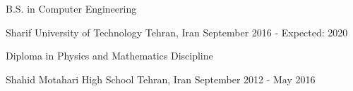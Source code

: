 \begin{cventries}
  \cventry
    {
        \begin{cvitems}
            B.S. in Computer Engineering
        \end{cvitems}
    }
    {Sharif University of Technology}
    {Tehran, Iran}
    {September 2016 - Expected: 2020}
    {}
\end{cventries}
\begin{cventries}
  \cventry
    {
        \begin{cvitems}
            Diploma in Physics and Mathematics Discipline
        \end{cvitems}
    }
    {Shahid Motahari High School}
    {Tehran, Iran}
    {September 2012 - May 2016}
    {}
\end{cventries}

